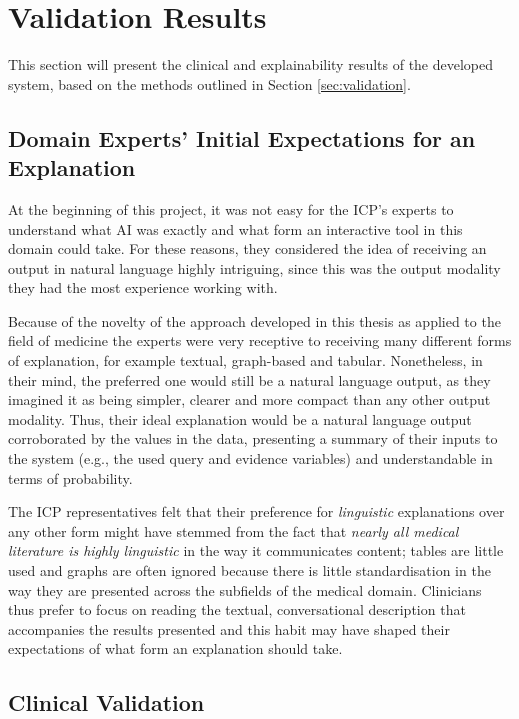 \section{Validation Results} \label{sec:results-validation-results}
This section will present the clinical and explainability results of the developed system, based on the methods outlined in Section \ref{sec:validation}.

\subsection{Domain Experts' Initial Expectations for an Explanation} \label{subsec:domain-experts-initial-expectations}
At the beginning of this project, it was not easy for the ICP's experts to understand what AI was exactly and what form an interactive tool in this domain could take.
For these reasons, they considered the idea of receiving an output in natural language highly intriguing, since this was the output modality they had the most experience working with.

Because of the novelty of the approach developed in this thesis as applied to the field of medicine the experts were very receptive to receiving many different forms of explanation, for example textual, graph-based and tabular.
Nonetheless, in their mind, the preferred one would still be a natural language output, as they imagined it as being simpler, clearer and more compact than any other output modality.
Thus, their ideal explanation would be a natural language output corroborated by the values in the data, presenting a summary of their inputs to the system (e.g., the used query and evidence variables) and understandable in terms of probability.

The ICP representatives felt that their preference for \textit{linguistic} explanations over any other form might have stemmed from the fact that \textit{nearly all medical literature is highly linguistic} in the way it communicates content; tables are little used and graphs are often ignored because there is little standardisation in the way they are presented across the subfields of the medical domain.
Clinicians thus prefer to focus on reading the textual, conversational description that accompanies the results presented and this habit may have shaped their expectations of what form an explanation should take.

\subsection{Clinical Validation} \label{subsec:clinical-validation-results}

